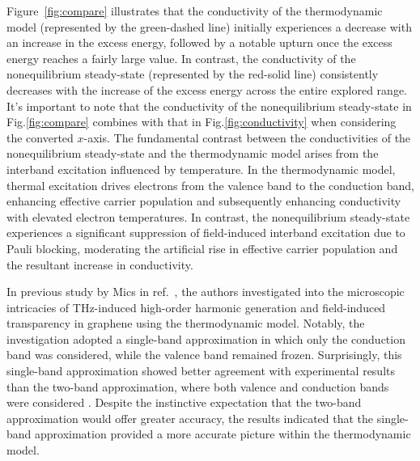 Figure~\ref{fig:compare} illustrates that the conductivity of the thermodynamic model (represented by the green-dashed line) initially experiences a decrease with an increase in the excess energy, followed by a notable upturn once the excess energy reaches a fairly large value. In contrast, the conductivity of the nonequilibrium steady-state (represented by the red-solid line) consistently decreases with the increase of the excess energy across the entire explored range. It's important to note that the conductivity of the nonequilibrium steady-state in Fig.\ref{fig:compare} combines with that in Fig.\ref{fig:conductivity} when considering the converted $x$-axis. The fundamental contrast between the conductivities of the nonequilibrium steady-state and the thermodynamic model arises from the interband excitation influenced by temperature. In the thermodynamic model, thermal excitation drives electrons from the valence band to the conduction band, enhancing effective carrier population and subsequently enhancing conductivity with elevated electron temperatures. In contrast, the nonequilibrium steady-state experiences a significant suppression of field-induced interband excitation due to Pauli blocking, moderating the artificial rise in effective carrier population and the resultant increase in conductivity.

In previous study by Mics in ref.~\cite{mics2015thermodynamic}, the authors investigated into the microscopic intricacies of THz-induced high-order harmonic generation and field-induced transparency in graphene using the thermodynamic model. Notably, the investigation adopted a single-band approximation in which only the conduction band was considered, while the valence band remained frozen. Surprisingly, this single-band approximation showed better agreement with experimental results than the two-band approximation, where both valence and conduction bands were considered \cite{kovalev2021electrical}. Despite the instinctive expectation that the two-band approximation would offer greater accuracy, the results indicated that the single-band approximation provided a more accurate picture within the thermodynamic model.

